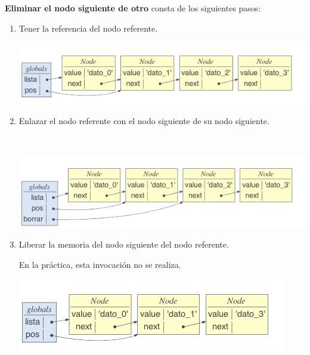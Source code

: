 \noindent \textbf{Eliminar el nodo siguiente de otro} consta de los siguientes pasos:
\begin{enumerate}
\item Tener la referencia del nodo referente.

\hfil\begin{minipage}{.3\textwidth}
\end{minipage}
\begin{minipage}{.6\textwidth}
\centerline{\includegraphics[width=\textwidth]{input/05-List-fig/ejemListaSingleLinkedDeleted1}}
\end{minipage}





\item Enlazar el nodo referente con el nodo siguiente de su nodo siguiente.


\hfil\begin{minipage}{.3\textwidth}
\\
\end{minipage}
\begin{minipage}{.6\textwidth}
\includegraphics[width=\textwidth]{input/05-List-fig/ejemListaSingleLinkedDeleted2}
\end{minipage}


\item Liberar la memoria del nodo siguiente del nodo referente.

\hfil\begin{minipage}{.3\textwidth}

En la práctica, esta invocación no se realiza.
\end{minipage}
\begin{minipage}{.6\textwidth}
\includegraphics[width=.9\textwidth]{input/05-List-fig/ejemListaSingleLinkedDeleted3}
\end{minipage}

\end{enumerate}

